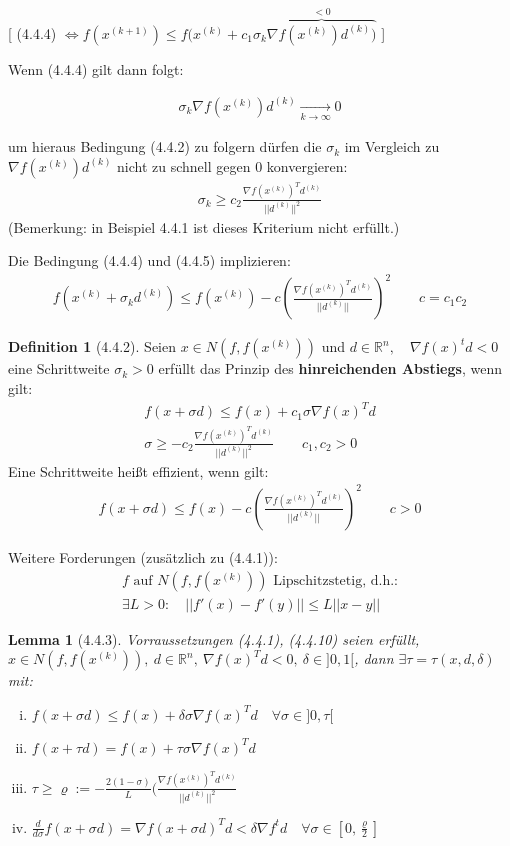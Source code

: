\documentclass[ngerman,halfparskip]{scrartcl}
\newtheorem*{lemma}{Lemma}
\theoremstyle{definition}
\newtheorem*{defin}{Definition}
\def\R{\mathbb R}
\begin{document}
[ (4.4.4) $\Leftrightarrow f(x^{(k+1)})\leq f(x^{(k)}+c_1\sigma_k\overbrace{\nabla f(x^{(k)})d^{(k)})}^{<0}$ ]

Wenn (4.4.4) gilt dann folgt:

\begin{gather*}
\sigma_k\nabla f(x^{(k)})d^{(k)}\xrightarrow[k\rightarrow \infty]{}0
\end{gather*}

um hieraus Bedingung (4.4.2) zu folgern dürfen die $\sigma_k$ im Vergleich zu $\nabla f (x^{(k)})d^{(k)}$ nicht zu schnell gegen $0$ konvergieren:
\begin{gather*}
\sigma_k\geq c_2 \frac{\nabla f(x^{(k)})^Td^{(k)}}{||d^{(k)}||^2}
\end{gather*}
(Bemerkung: in Beispiel 4.4.1 ist dieses Kriterium nicht erfüllt.)

Die Bedingung (4.4.4) und (4.4.5) implizieren:
\begin{gather*}\tag{4.4.6}
f(x^{(k)}+\sigma_kd^{(k)})\leq f(x^{(k)}) - c\left( \frac{\nabla f(x^{(k)})^Td^{(k)}}{||d^{(k)}||} \right)^2 \qquad c=c_1c_2
\end{gather*}

\begin{defin}[4.4.2]
Seien $x\in N(f,f(x^{(k)}))$ und $d\in\R^n, \quad \nabla f (x)^t d<0$ eine Schrittweite $\sigma_k>0$ erfüllt das Prinzip des \textbf{hinreichenden Abstiegs}, wenn gilt:
\begin{gather*}\tag{4.4.7}
f(x+\sigma d)\leq f(x)+c_1\sigma\nabla f(x)^Td\\
\tag{4.4.8} \sigma \geq -c_2 \frac{\nabla f(x^{(k)})^Td^{(k)}}{||d^{(k)}||^2} \qquad c_1,c_2>0
\end{gather*}
Eine Schrittweite heißt effizient, wenn gilt:
\begin{gather*}
\tag{4.4.9} f(x+\sigma d)\leq f(x)-c\left( \frac{\nabla f(x^{(k)})^Td^{(k)}}{||d^{(k)}||} \right)^2 \qquad c>0
\end{gather*}
\end{defin}

Weitere Forderungen (zusätzlich zu (4.4.1)):
\begin{gather*}
\tag{4.4.10} f\text{ auf } N(f,f(x^{(k)})) \text{ Lipschitzstetig, d.h.:}\\
\exists L>0: \quad ||f'(x)-f'(y)||\leq L||x-y||
\end{gather*}

\begin{lemma}[4.4.3]
Vorraussetzungen (4.4.1), (4.4.10) seien erfüllt, $x\in N(f,f(x^{(k)})),~ d\in\R^n,~ \nabla f(x)^Td<0,~ \delta \in ]0,1[$, dann $\exists \tau=\tau(x,d,\delta)$ mit:
\begin{enumerate}[(i)]
\item  $f(x+\sigma d)\leq f(x)+\delta\sigma\nabla f(x)^Td \quad \forall \sigma \in ]0,\tau[$
\item $f(x+\tau d)= f(x)+\tau\sigma\nabla f(x)^Td$
\item $\tau\geq \varrho :=-\frac{2(1-\sigma)}L( \frac{\nabla f(x^{(k)})^Td^{(k)}}{||d^{(k)}||^2}$
\item  $\frac d{d\sigma}f(x+\sigma d)=\nabla f(x+\sigma d)^Td < \delta\nabla f^td \quad \forall \sigma \in [0,\frac \varrho 2]$ 
\end{enumerate}
\end{lemma}
\end{document}
